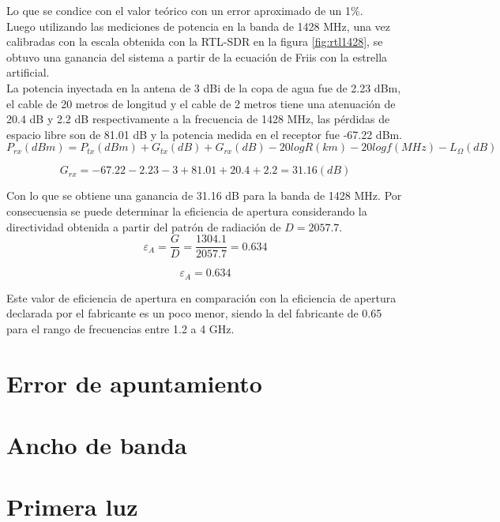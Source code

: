 Lo que se condice con el valor teórico con un error aproximado de un 1\%.\\

Luego utilizando las mediciones de potencia en la banda de 1428 MHz, una vez calibradas con la escala obtenida con la RTL-SDR en la figura \ref{fig:rtl1428}, se obtuvo una ganancia del sistema a partir de la ecuación de Friis con la estrella artificial.\\

La potencia inyectada en la antena de 3 dBi de la copa de agua fue de 2.23 dBm, el cable de 20 metros de longitud y el cable de 2 metros tiene una atenuación de 20.4 dB y 2.2 dB respectivamente a la frecuencia de 1428 MHz, las pérdidas de espacio libre son de 81.01 dB y la potencia medida en el receptor fue -67.22 dBm.\\

\begin{equation}
    P_{rx}(dBm) = P_{tx}(dBm) + G_{tx}(dB) + G_{rx}(dB) - 20log{R}(km) - 20log{f}(MHz) - L_{\Omega}(dB)
\end{equation}

\begin{equation}
    G_{rx} = -67.22 -2.23 - 3 + 81.01 + 20.4 + 2.2 = 31.16 (dB)
\end{equation}

Con lo que se obtiene una ganancia de 31.16 dB para la banda de 1428 MHz. Por consecuensia se puede determinar la eficiencia de apertura considerando la directividad obtenida a partir del patrón de radiación de $D=2057.7$.\\

\begin{equation}
    \varepsilon_{A} = \frac{G}{D} = \frac{1304.1}{2057.7} = 0.634
\end{equation}

\begin{equation}
    \varepsilon_{A} = 0.634
\end{equation}

Este valor de eficiencia de apertura en comparación con la eficiencia de apertura declarada por el fabricante es un poco menor, siendo la del fabricante de 0.65 para el rango de frecuencias entre 1.2 a 4 GHz.\\

\section{Error de apuntamiento}

\section{Ancho de banda}

\section{Primera luz}